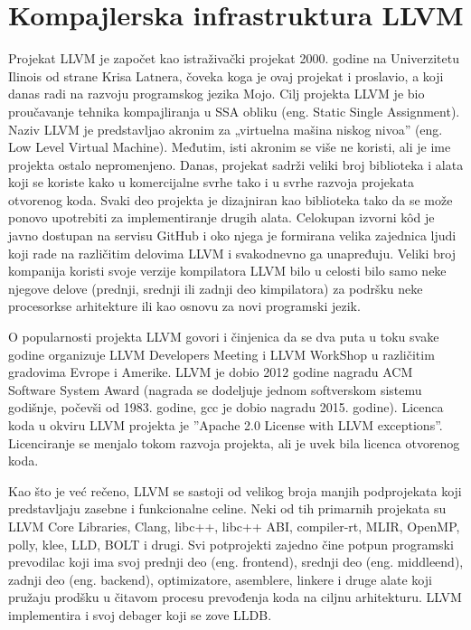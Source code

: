 \documentclass[12pt,oneside]{memoir}
\begin{document}
\section{Kompajlerska infrastruktura LLVM}
Projekat LLVM je započet kao istraživački projekat 2000. godine na Univerzitetu 
Ilinois od strane Krisa Latnera, čoveka koga je ovaj projekat i proslavio, a koji danas radi na razvoju programskog jezika Mojo. 
Cilj projekta LLVM je bio proučavanje tehnika kompajliranja u SSA obliku (eng. 
Static Single Assignment). Naziv LLVM je predstavljao akronim za „virtuelna 
mašina niskog nivoa” (eng. Low Level Virtual Machine). Međutim, isti akronim se 
više ne koristi, ali je ime projekta ostalo nepromenjeno. Danas, projekat 
sadrži veliki broj biblioteka i alata koji se koriste kako u komercijalne svrhe 
tako i u svrhe razvoja projekata otvorenog koda. Svaki deo projekta je 
dizajniran kao biblioteka tako da se može ponovo upotrebiti za implementiranje 
drugih alata. 
Celokupan izvorni kôd je javno dostupan na servisu GitHub i oko njega je 
formirana velika zajednica ljudi koji rade na različitim delovima LLVM i 
svakodnevno ga unapređuju. Veliki broj kompanija koristi svoje verzije 
kompilatora LLVM bilo u celosti bilo samo neke njegove delove (prednji, srednji 
ili zadnji deo kimpilatora) za podršku neke procesorkse arhitekture ili kao 
osnovu za novi programski jezik. 

O popularnosti projekta LLVM govori i činjenica da se dva puta u toku svake 
godine organizuje LLVM Developers Meeting i LLVM WorkShop u različitim 
gradovima Evrope i Amerike. LLVM je dobio 2012 godine nagradu ACM Software System Award (nagrada se dodeljuje jednom softverskom sistemu godišnje, počevši od 1983. godine, gcc 
je dobio nagradu 2015. godine). Licenca koda u okviru LLVM projekta je ”Apache 2.0 License with LLVM exceptions”. Licenciranje se menjalo tokom razvoja projekta, ali je uvek bila licenca otvorenog koda.

Kao što je već rečeno, LLVM se sastoji od velikog broja manjih podprojekata 
koji predstavljaju zasebne i funkcionalne celine. Neki od tih primarnih projekata su 
LLVM Core Libraries, Clang, libc++, libc++ ABI, compiler-rt, MLIR, OpenMP, polly, klee, LLD, BOLT i drugi. Svi potprojekti zajedno čine potpun programski prevodilac koji ima
svoj prednji deo (eng. frontend), srednji deo (eng. middleend), zadnji deo
(eng. backend), optimizatore, asemblere, linkere i druge alate koji pružaju prodšku u čitavom procesu prevođenja koda na ciljnu arhitekturu. LLVM implementira i svoj
debager koji se zove LLDB.
\end{document}
